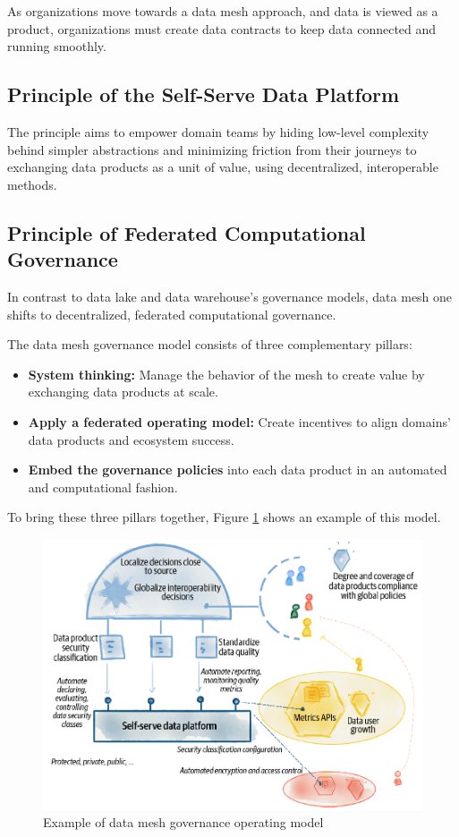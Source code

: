 \documentclass[12pt, a4paper]{book}
\begin{document}
As organizations move towards a data mesh approach, and data is viewed as a product, organizations must create data contracts to keep data connected and running smoothly.

\subsection{Principle of the Self-Serve Data Platform}
The principle aims to empower domain teams by hiding low-level complexity behind simpler abstractions and minimizing friction from their journeys to exchanging data products as a unit of value, using decentralized, interoperable methods.


\subsection{Principle of Federated Computational Governance}
In contrast to data lake and data warehouse's governance models, data mesh one shifts to decentralized, federated computational governance.

The data mesh governance model consists of three complementary pillars:
	\begin{itemize}
		\item \textbf{System thinking:} Manage the behavior of the mesh to create value by exchanging data products at scale.
		\item \textbf{Apply a federated operating model:} Create incentives to align domains' data products and ecosystem success.
		\item \textbf{Embed the governance policies} into each data product in an automated and computational fashion. 
	\end{itemize}

To bring these three pillars together, Figure \ref{DataGov} shows an example of this model.

\begin{figure}[h]
	\begin{framed}
		\centering
		\includegraphics[width=12cm]{DataGov.png}
		\caption{Example of data mesh governance operating model}
		\label{DataGov}
	\end{framed}
\end{figure}
\end{document}
